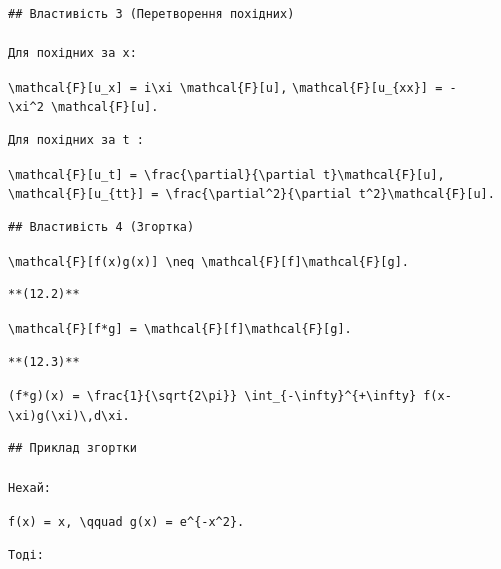\documentclass[
  ukrainian,
]{article}
\begin{document}
\begin{verbatim}
## Властивість 3 (Перетворення похідних)

Для похідних за x:
\end{verbatim}

\texttt{\textbackslash{}mathcal\{F\}{[}u\_x{]}\ =\ i\textbackslash{}xi\ \textbackslash{}mathcal\{F\}{[}u{]},}
\texttt{\textbackslash{}mathcal\{F\}{[}u\_\{xx\}{]}\ =\ -\textbackslash{}xi\^{}2\ \textbackslash{}mathcal\{F\}{[}u{]}.}

\begin{verbatim}
Для похідних за t :
\end{verbatim}

\texttt{\textbackslash{}mathcal\{F\}{[}u\_t{]}\ =\ \textbackslash{}frac\{\textbackslash{}partial\}\{\textbackslash{}partial\ t\}\textbackslash{}mathcal\{F\}{[}u{]},}
\texttt{\textbackslash{}mathcal\{F\}{[}u\_\{tt\}{]}\ =\ \textbackslash{}frac\{\textbackslash{}partial\^{}2\}\{\textbackslash{}partial\ t\^{}2\}\textbackslash{}mathcal\{F\}{[}u{]}.}

\begin{verbatim}
## Властивість 4 (Згортка)
\end{verbatim}

\texttt{\textbackslash{}mathcal\{F\}{[}f(x)g(x){]}\ \textbackslash{}neq\ \textbackslash{}mathcal\{F\}{[}f{]}\textbackslash{}mathcal\{F\}{[}g{]}.}

\begin{verbatim}
**(12.2)**
\end{verbatim}

\texttt{\textbackslash{}mathcal\{F\}{[}f*g{]}\ =\ \textbackslash{}mathcal\{F\}{[}f{]}\textbackslash{}mathcal\{F\}{[}g{]}.}

\begin{verbatim}
**(12.3)**
\end{verbatim}

\texttt{(f*g)(x)\ =\ \textbackslash{}frac\{1\}\{\textbackslash{}sqrt\{2\textbackslash{}pi\}\}\ \textbackslash{}int\_\{-\textbackslash{}infty\}\^{}\{+\textbackslash{}infty\}\ f(x-\textbackslash{}xi)g(\textbackslash{}xi)\textbackslash{},d\textbackslash{}xi.}

\begin{verbatim}
## Приклад згортки

Нехай:
\end{verbatim}

\texttt{f(x)\ =\ x,\ \textbackslash{}qquad\ g(x)\ =\ e\^{}\{-x\^{}2\}.}

\begin{verbatim}
Тоді:
\end{verbatim}
\end{document}
